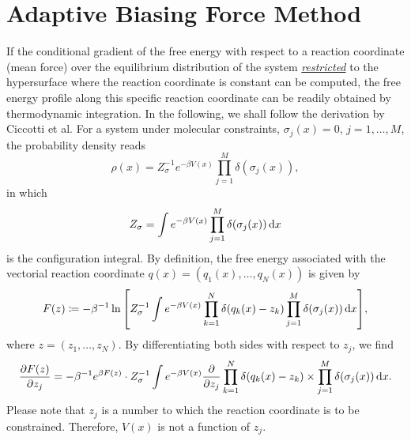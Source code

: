 \section{Adaptive Biasing Force Method\label{Sec:ES:ABF}}
If the conditional gradient of the free energy with respect to a reaction coordinate (mean force) over the equilibrium distribution of the system \underline{\textit{restricted}} to the hypersurface where the reaction coordinate is constant can be computed, the free energy profile along this specific reaction coordinate can be readily obtained by thermodynamic integration. In the following, we shall follow the derivation by Ciccotti et al.\cite{CiccottiCPC2005}
For a system under molecular constraints, $\sigma_j(x)=0,\, j=1,\dots,M$, the probability density reads
\begin{equation}
	\rho(x)=Z_\sigma^{-1}e^{-\beta V(x)}\prod_{j=1}^M\delta(\sigma_j(x)),
\end{equation}
in which
\begin{equation}
	Z_\sigma=\int e^{-\beta V(x)}\prod_{j=1}^M\delta(\sigma_j(x))\mathop{}\!\mathrm{d} x
\end{equation}
is the configuration integral. By definition, the free energy associated with the vectorial reaction coordinate $q(x)=(q_1(x),\dots,q_N(x))$ is given by
\begin{equation}
	F(z)\coloneqq -\beta^{-1}\ln{\left[Z_\sigma^{-1}\int e^{-\beta V(x)}\prod_{k=1}^{N}\delta(q_k(x)-z_k)\prod_{j=1}^M\delta(\sigma_j(x))\mathop{}\!\mathrm{d}x\right]},
\end{equation}
where $z=(z_1,\dots,z_N)$. By differentiating both sides with respect to $z_j$, we find
\begin{equation}
    \frac{\partial F(z)}{\partial z_j}=-\beta^{-1}e^{\beta F(z)}\cdot Z_\sigma^{-1} \int e^{-\beta V(x)}\frac{\partial}{\partial z_j}\prod_{k=1}^{N}\delta(q_k(x)-z_k)\times \prod_{j=1}^M\delta(\sigma_j(x))\mathop{}\!\mathrm{d} x.
\end{equation}
Please note that $z_j$ is a number to which the reaction coordinate is to be constrained. Therefore, $V(x)$ is not a function of $z_j$.


